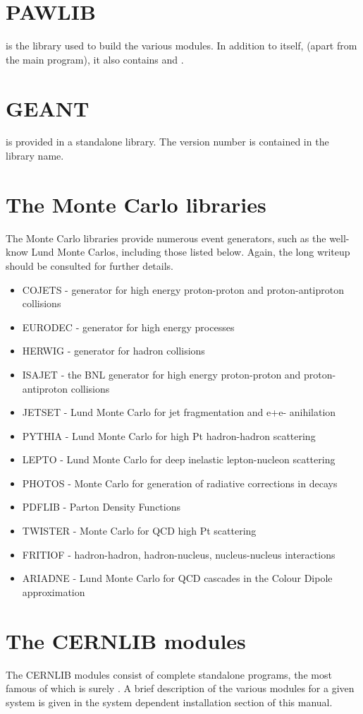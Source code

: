 \section{PAWLIB}

\PAWLIB{} is the library used to build the various
\PAW{} modules. In addition to \PAW{} itself, (apart
from the main program), it also contains
\COMIS{} and \SIGMA{}.

\section{GEANT}

\GEANT{} is provided in a standalone library. The version
number is contained in the library name.

\section{The Monte Carlo libraries}

The Monte Carlo libraries provide numerous event
generators, such as the well-know Lund Monte Carlos,
including those listed below. Again, the long writeup
should be consulted for further details.


\begin{itemize}
\item
COJETS - generator for high energy proton-proton and
proton-antiproton collisions
\item
EURODEC - generator for high energy processes
\item
HERWIG - generator for hadron collisions
\item
ISAJET - the BNL generator for high energy proton-proton and
proton-antiproton collisions
\item
JETSET - Lund Monte Carlo for jet fragmentation and
e+e- anihilation
\item
PYTHIA - Lund Monte Carlo for high Pt hadron-hadron scattering
\item
LEPTO - Lund Monte Carlo for deep inelastic lepton-nucleon scattering
\item
PHOTOS - Monte Carlo for generation of radiative
corrections in decays
\item
PDFLIB - Parton Density Functions
\item
TWISTER - Monte Carlo for QCD high Pt scattering
\item
FRITIOF - hadron-hadron, hadron-nucleus, nucleus-nucleus interactions
\item
ARIADNE - Lund Monte Carlo for QCD cascades in the Colour Dipole approximation
\end{itemize}

\section{The CERNLIB modules}

The CERNLIB modules consist of complete standalone programs,
the most famous of which is surely \PAW{}. A brief
description of the various modules for a given system
is given in the system dependent installation section
of this manual.
